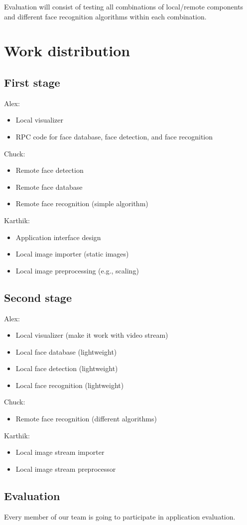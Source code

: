\documentclass[onecolumn,conference]{IEEEtran}
\begin{document}
Evaluation will consist of testing all combinations of local/remote components and different face recognition algorithms within each combination.

\section{Work distribution}

\subsection{First stage}

Alex:
\begin{itemize}
	\item Local visualizer
	\item RPC code for face database, face detection, and face recognition
\end{itemize}

Chuck:
\begin{itemize}
	\item Remote face detection
	\item Remote face database
	\item Remote face recognition (simple algorithm)
\end{itemize}

Karthik:
\begin{itemize}
	\item Application interface design
	\item Local image importer (static images)
	\item Local image preprocessing (e.g., scaling)
\end{itemize}

\subsection{Second stage}

Alex:
\begin{itemize}
	\item Local visualizer (make it work with video stream)
	\item Local face database (lightweight)
	\item Local face detection (lightweight)
	\item Local face recognition (lightweight)
\end{itemize}

Chuck:
\begin{itemize}
	\item Remote face recognition (different algorithms)
\end{itemize}

Karthik:
\begin{itemize}
	\item Local image stream importer
	\item Local image stream preprocessor
\end{itemize}

\subsection{Evaluation}

Every member of our team is going to participate in application evaluation.




\end{document}
